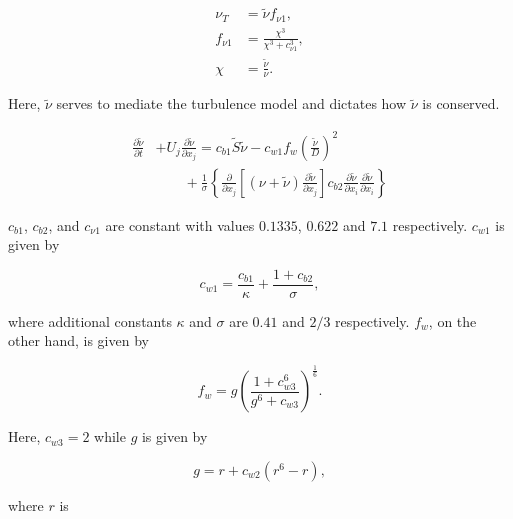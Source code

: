 \documentclass[a4paper,fleqn]{cas-sc}
\begin{document}
\begin{subequations}
  \label{eq:kineticeddy}
  \begin{align}
    \nu_{T}   & = \tilde{\nu} f_{\nu 1}, \label{eq:kineticeddyA}\\
    f_{\nu 1} & = \frac{\chi^{3}}{\chi^{3}+c^{3}_{\nu 1}}, \label{eq:kineticeddyB}\\
    \chi      & = \frac{\tilde{\nu}}{\nu}. \label{eq:kineticeddyC}
\end{align}
\end{subequations}

\noindent Here, $\tilde{\nu}$ serves to mediate the turbulence model and dictates how $\tilde{\nu}$ is conserved.

\begin{align}
  \label{eq:kineticEddyTransport}
  \frac{\partial \tilde{\nu}}{\partial t} &+ U_{j} \frac{\partial \tilde{\nu}}{\partial x_{j}} = c_{b1}\tilde{S}\tilde{\nu} - c_{w1} f_{w} \left( \frac{\tilde{\nu}}{D} \right)^{2} \nonumber \\
  &\qquad {} + \frac{1}{\sigma} \left\{ \frac{\partial}{\partial x_{j}} \left[ \left( \nu + \tilde{\nu} \right) \frac{\partial \tilde{\nu}}{\partial x_{j}} \right] c_{b2} \frac{\partial \tilde{\nu}}{\partial x_{i}} \frac{\partial \tilde{\nu}}{\partial x_{i}} \right\}
\end{align}

$c_{b1}$, $c_{b2}$, and $c_{\nu 1}$ are constant with values $0.1335$, $0.622$ and $7.1$ respectively. $c_{w1}$ is given by

\begin{equation}
  c_{w1} = \frac{c_{b1}}{\kappa} + \frac{1+c_{b2}}{\sigma},
  \label{eq:cw1}
\end{equation}

\noindent where additional constants $\kappa$ and $\sigma$ are $0.41$ and $2/3$ respectively. $f_{w}$, on the other hand, is given by

\begin{equation}
  f_{w} = g \left( \frac{1 + c^{6}_{w3}}{g^{6} + c_{w3}} \right)^{\frac{1}{6}}.
  \label{eq:fw}
\end{equation}

\noindent Here, $c_{w3} = 2$ while $g$ is given by

\begin{equation}
  g = r + c_{w2} \left( r^{6} - r \right),
  \label{eq:g}
\end{equation}

\noindent where $r$ is
\end{document}
